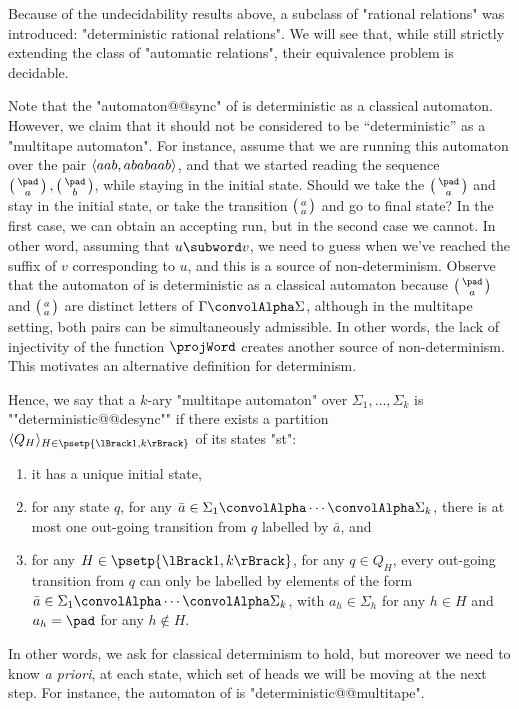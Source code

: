 Because of the undecidability results above, a subclass of "rational relations" was introduced:
"deterministic rational relations". We will see that, while still strictly extending the class of
"automatic relations", their equivalence problem is decidable.

Note that the "automaton@@sync" of  is deterministic
as a classical automaton. However, we claim that it should not be considered to be ``deterministic''
as a "multitape automaton".
For instance, assume that we are running this automaton over the pair
$\langle aab, ababaab\rangle$, and that we started reading the sequence $\pair{\pad}{a}, \pair{\pad}{b}$,
while staying in the initial state. Should we take the
$\pair{\pad}{a}$ and stay in the initial state, or take the transition $\pair{a}{a}$ and go to 
final state? In the first case, we can obtain an accepting run, but in the second case we cannot.
In other word, assuming that $u \subword v$, we need to guess when we've reached the suffix of
$v$ corresponding to $u$, and this is a source of non-determinism. Observe that
the automaton of  is deterministic as a classical automaton
because $\pair{\pad}{a}$ and $\pair{a}{a}$ are distinct letters of $\Gamma\convolAlpha\Sigma$, 
although in the multitape setting, both pairs can be simultaneously admissible.
In other words, the lack of injectivity of the function $\projWord$ creates another
source of non-determinism. This motivates an alternative definition for determinism.

Hence, we say that a $k$-ary "multitape automaton" over $\Sigma_1,\hdots,\Sigma_k$
is ""deterministic@@desync"" if
there exists a partition $\tup{Q_H}_{H \in \psetp{\lBrack 1,k\rBrack}}$ of its states "st":
\begin{enumerate}
	\item it has a unique initial state,
	\item for any state $q$, for any $\bar a \in \Sigma_1\convolAlpha\cdots\convolAlpha\Sigma_k$,
		there is at most one out-going transition from $q$ labelled by $\bar a$, and
	\item for any $H\in\psetp{\lBrack 1,k\rBrack}$, for any $q \in Q_H$,
		every out-going transition from $q$ can only be labelled by elements of
		the form $\bar a \in \Sigma_1\convolAlpha\cdots\convolAlpha\Sigma_k$, with
		$a_h \in \Sigma_h$ for any $h\in H$ and $a_h = \pad$ for any $h\not\in H$.
\end{enumerate}
In other words, we ask for classical determinism to hold, but moreover we need to know \emph{a priori}, at each state, which set of heads we will be moving at the next step.
For instance, the automaton of  is "deterministic@@multitape".

